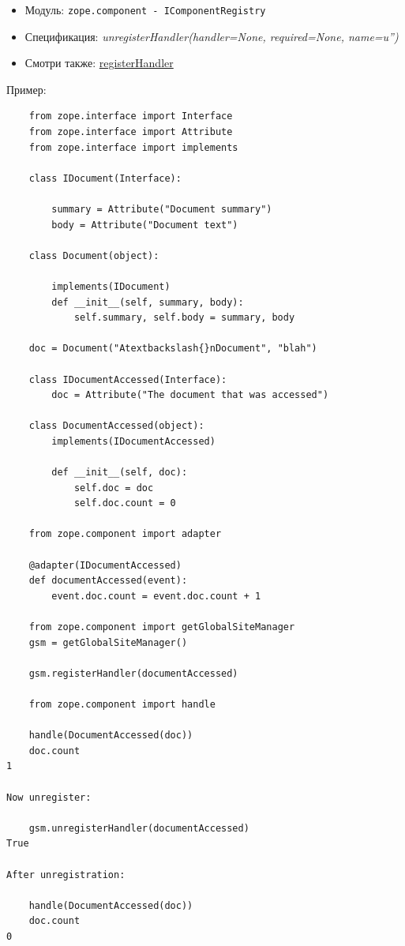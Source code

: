 \documentclass[a4paper,openany,twoside,final]{book}
\providecommand*{\DUroletitlereference}[1]{\textsl{#1}}
\begin{document}
\begin{itemize}

\item Модуль: \texttt{zope.component - IComponentRegistry}

\item Спецификация: \DUroletitlereference{unregisterHandler(handler=None, required=None, name=u'')}

\item Смотри также: \hyperref[registerhandler]{registerHandler}

\end{itemize}

Пример:

\begin{verbatim}
    from zope.interface import Interface
    from zope.interface import Attribute
    from zope.interface import implements

    class IDocument(Interface):

        summary = Attribute("Document summary")
        body = Attribute("Document text")

    class Document(object):

        implements(IDocument)
        def __init__(self, summary, body):
            self.summary, self.body = summary, body

    doc = Document("Atextbackslash{}nDocument", "blah")

    class IDocumentAccessed(Interface):
        doc = Attribute("The document that was accessed")

    class DocumentAccessed(object):
        implements(IDocumentAccessed)

        def __init__(self, doc):
            self.doc = doc
            self.doc.count = 0

    from zope.component import adapter

    @adapter(IDocumentAccessed)
    def documentAccessed(event):
        event.doc.count = event.doc.count + 1

    from zope.component import getGlobalSiteManager
    gsm = getGlobalSiteManager()

    gsm.registerHandler(documentAccessed)

    from zope.component import handle

    handle(DocumentAccessed(doc))
    doc.count
1

Now unregister:

    gsm.unregisterHandler(documentAccessed)
True

After unregistration:

    handle(DocumentAccessed(doc))
    doc.count
0
\end{verbatim}
\end{document}
